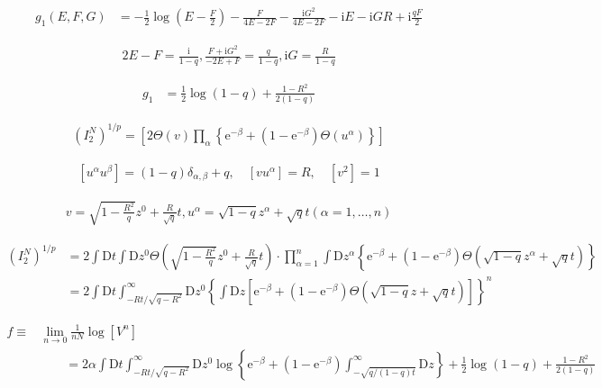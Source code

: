 \documentclass{article}
\begin{document}
\begin{align*}
g_{1}(E, F, G) &= -\frac{1}{2} \log \left(E - \frac{F}{2}\right) - \frac{F}{4 E - 2 F} - \frac{\mathrm{i} G^{2}}{4 E - 2 F} - \mathrm{i} E - \mathrm{i} G R + \mathrm{i} \frac{q F}{2} \tag{8.33}
\end{align*}

\begin{align*}
2 E-F=\frac{\mathrm{i}}{1-q}, \frac{F+\mathrm{i} G^{2}}{-2 E+F}=\frac{q}{1-q}, \mathrm{i} G=\frac{R}{1-q}
\tag{8.34}
\end{align*}

\begin{align*}
g_{1} &= \frac{1}{2} \log(1 - q) + \frac{1 - R^{2}}{2(1 - q)}
\tag{8.35}
\end{align*}

\begin{align*}
\left(I_{2}^{N}\right)^{1 / p}=\left[2 \Theta(v) \prod_{\alpha}\left\{\mathrm{e}^{-\beta}+\left(1-\mathrm{e}^{-\beta}\right) \Theta\left(u^{\alpha}\right)\right\}\right]
\tag{8.36}
\end{align*}

\begin{align*}
\left[u^{\alpha} u^{\beta}\right]=(1-q) \delta_{\alpha, \beta}+q, \quad\left[v u^{\alpha}\right]=R, \quad\left[v^{2}\right]=1
\tag{8.37}
\end{align*}

\begin{align*}
v=\sqrt{1-\frac{R^{2}}{q}} z^{0}+\frac{R}{\sqrt{q}} t, u^{\alpha}=\sqrt{1-q} z^{\alpha}+\sqrt{q} t(\alpha=1, \ldots, n)
\tag{8.38}
\end{align*}

\begin{align*}
\left(I_{2}^{N}\right)^{1 / p} &= 2 \int \mathrm{D} t \int \mathrm{D} z^{0} \Theta\left(\sqrt{1-\frac{R^{2}}{q}} z^{0}+\frac{R}{\sqrt{q}} t\right) \cdot \prod_{\alpha=1}^{n} \int \mathrm{D} z^{\alpha}\left\{\mathrm{e}^{-\beta}+\left(1-\mathrm{e}^{-\beta}\right) \Theta\left(\sqrt{1-q} z^{\alpha}+\sqrt{q} t\right)\right\} \\
& = 2 \int \mathrm{D} t \int_{-R t / \sqrt{q - R^{2}}}^{\infty} \mathrm{D} z^{0} \left\{\int \mathrm{D} z\left[\mathrm{e}^{-\beta} + \left(1-\mathrm{e}^{-\beta}\right) \Theta\left(\sqrt{1-q} z + \sqrt{q} t\right)\right]\right\}^{n} \tag{8.39}
\end{align*}

\begin{align*}
f \equiv & \lim _{n \rightarrow 0} \frac{1}{n N} \log \left[V^{n}\right] \\
&\qquad =2 \alpha \int \mathrm{D} t \int_{-R t / \sqrt{q-R^{2}}}^{\infty} \mathrm{D} z^{0} \log \left\{\mathrm{e}^{-\beta} + \left(1-\mathrm{e}^{-\beta}\right) \int_{-\sqrt{q /(1-q) t}}^{\infty} \mathrm{D} z\right\}+\frac{1}{2} \log (1-q)+\frac{1-R^{2}}{2(1-q)}
\tag{8.40}
\end{align*}
\end{document}
